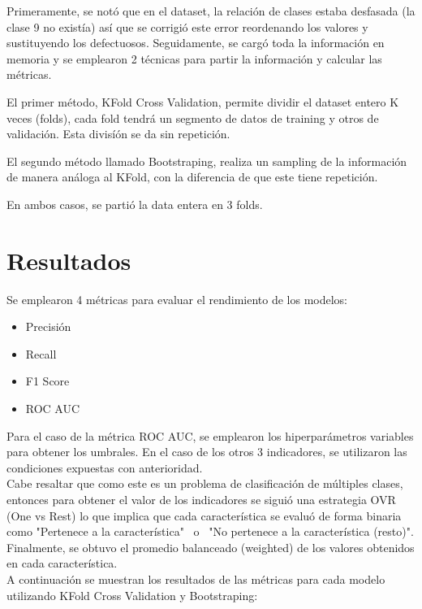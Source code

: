 \documentclass[conference]{IEEEtran}
\begin{document}
Primeramente, se notó que en el dataset, la relación de clases estaba desfasada (la clase 9 no existía)
así que se corrigió este error reordenando los valores y sustituyendo los defectuosos.
Seguidamente, se cargó toda la información en memoria y se emplearon 2 técnicas para partir la información y calcular las métricas.

El primer método, KFold Cross Validation, permite dividir el dataset
entero K veces (folds), cada fold tendrá un segmento de datos de training y otros de validación. Esta divisíón se da sin repetición.

El segundo método llamado Bootstraping, realiza un sampling de la información
de manera análoga al KFold, con la diferencia de que este tiene repetición.

En ambos casos, se partió la data entera en 3 folds.

\section{Resultados}

Se emplearon 4 métricas para evaluar el rendimiento de los modelos:
\begin{itemize}
  \item Precisión
  \item Recall
  \item F1 Score
  \item ROC AUC
\end{itemize}

Para el caso de la métrica ROC AUC, se emplearon los hiperparámetros variables para obtener los umbrales.
En el caso de los otros 3 indicadores, se utilizaron las condiciones expuestas con anterioridad.\\
Cabe resaltar que como este es un problema de clasificación de múltiples clases, entonces
para obtener el valor de los indicadores se siguió una estrategia OVR (One vs Rest) lo que implica
que cada característica se evaluó de forma binaria como "Pertenece a la característica" \ o \ "No pertenece a la característica (resto)".\\
Finalmente, se obtuvo el promedio balanceado (weighted) de los valores obtenidos en cada característica. \\

A continuación se muestran los resultados de las métricas para cada modelo
utilizando KFold Cross Validation y Bootstraping:
\end{document}
